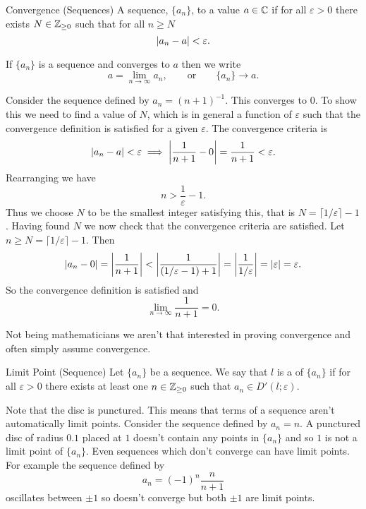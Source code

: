 \documentclass{article}
\newcommand{\discPunctured}[2]{D'\left({#1}; {#2}\right)}
\begin{document}
    \begin{definition}{Convergence (Sequences)}{}
        A sequence, \(\{a_n\}\),  to a value \(a\in\mathbb{C}\) if for all \(\varepsilon>0\) there exists \(N\in\mathbb{Z}_{\ge0}\) such that for all \(n \ge N\)
        \[\abs{a_n - a} < \varepsilon.\]
    \end{definition}
    \begin{notation*}{}
        If \(\{a_n\}\) is a sequence and converges to \(a\) then we write
        \[a = \lim_{n\to\infty} a_n, \qquad\text{or}\qquad \{a_n\}\to a.\]
    \end{notation*}
    \begin{example}
        Consider the sequence defined by \(a_n = (n + 1)^{-1}\).
        This converges to 0.
        To show this we need to find a value of \(N\), which is in general a function of \(\varepsilon\) such that the convergence definition is satisfied for a given \(\varepsilon\).
        The convergence criteria is
        \[\abs{a_n - a} < \varepsilon \implies \abs{\frac{1}{n + 1} - 0} = \frac{1}{n + 1} < \varepsilon.\]
        Rearranging we have
        \[n > \frac{1}{\varepsilon} - 1.\]
        Thus we choose \(N\) to be the smallest integer satisfying this, that is \(N = \lceil 1/\varepsilon\rceil - 1\).
        Having found \(N\) we now check that the convergence criteria are satisfied.
        Let \(n \ge N = \lceil 1/\varepsilon \rceil - 1\).
        Then
        \[\abs{a_n - 0} = \abs{\frac{1}{n + 1}} < \abs{\frac{1}{(1/\varepsilon - 1) + 1}} = \abs{\frac{1}{1/\varepsilon}} = \abs{\varepsilon} = \varepsilon.\]
        So the convergence definition is satisfied and
        \[\lim_{n\to\infty} \frac{1}{n + 1} = 0.\]
    \end{example}
    Not being mathematicians we aren't that interested in proving convergence and often simply assume convergence.
    
    \begin{definition}{Limit Point (Sequence)}{}
        Let \(\{a_n\}\) be a sequence. We say that \(l\) is a  of \(\{a_n\}\) if for all \(\varepsilon>0\) there exists at least one \(n\in\mathbb{Z}_{\ge 0}\) such that \(a_n\in\discPunctured{l}{\varepsilon}\).
    \end{definition}
    Note that the disc is punctured.
    This means that terms of a sequence aren't automatically limit points.
    Consider the sequence defined by \(a_n = n\).
    A punctured disc of radius \(0.1\) placed at \(1\) doesn't contain any points in \(\{a_n\}\) and so \(1\) is not a limit point of \(\{a_n\}\).
    Even sequences which don't converge can have limit points.
    For example the sequence defined by
    \[a_n = (-1)^n\frac{n}{n + 1}\]
    oscillates between \(\pm 1\) so doesn't converge but both \(\pm 1\) are limit points.
    
\end{document}
